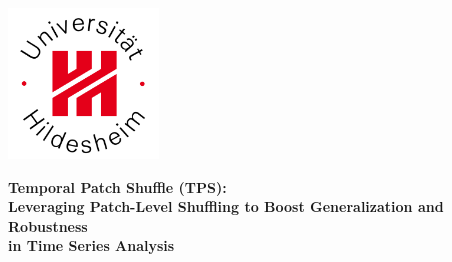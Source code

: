 \documentclass[a4paper,12pt]{report}
\begin{document}
\sloppy



\begin{titlepage}

\center %


\vspace{-1cm}
\includegraphics[width=4cm]{logoUHi.jpg}
\vspace{1cm}



{\Large \bfseries Temporal Patch Shuffle (TPS):\\
Leveraging Patch-Level Shuffling to Boost Generalization and Robustness\\
\vspace{0.3cm} in Time Series Analysis}


\vspace{2cm}


\end{titlepage}
\end{document}
